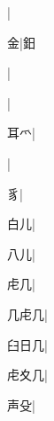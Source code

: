 \begin{multicols}{2}
{{}\mktsJzrVerticalBar{}{\cjk{}{\cnsym{}　}{\cnsym{}　}{\cnsym{}　}}|{}\par
{\cjk{}{\cnsym{}　}{\cnsym{}　}金}\mktsJzrVerticalBar{}{\cjk{}{\cnsym{}　}{\cnsym{}　}{\cnsym{}　}}|{\cjk{}鈤}\par
{}\mktsJzrVerticalBar{}{\cjk{}{\cnsym{}　}{\cnsym{}　}{\cnsym{}　}}|{}\par
{}\mktsJzrVerticalBar{}{\cjk{}{\cnsym{}　}{\cnsym{}　}{\cnsym{}　}}|{}\par
{\cjk{}{\cnsym{}　}耳{爫}}\mktsJzrVerticalBar{}{\cjk{}{\cnsym{}　}{\cnsym{}　}{\cnsym{}　}}|{}\par
{}\mktsJzrVerticalBar{}{\cjk{}{\cnsym{}　}{\cnsym{}　}{\cnsym{}　}}|{}\par
{\cjk{}{\cnsym{}　}{\cnsym{}　}豸}\mktsJzrVerticalBar{}{\cjk{}{\cnsym{}　}{\cnsym{}　}{\cnsym{}　}}|{}\par
{\cjk{}{\cnsym{}　}白儿}\mktsJzrVerticalBar{}{\cjk{}{\cnsym{}　}{\cnsym{}　}{\cnsym{}　}}|{}\par
{\cjk{}{\cnsym{}　}八儿}\mktsJzrVerticalBar{}{\cjk{}{\cnsym{}　}{\cnsym{}　}{\cnsym{}　}}|{}\par
{\cjk{}{\cnsym{}　}虍几}\mktsJzrVerticalBar{}{\cjk{}{\cnsym{}　}{\cnsym{}　}{\cnsym{}　}}|{}\par
{\cjk{}几虍几}|{}\par
{\cjk{}臼日几}|{}\par
{\cjk{}虍夊几}\mktsJzrVerticalBar{}{\cjk{}{\cnsym{}　}{\cnsym{}　}{\cnsym{}　}}|{}\par
{\cjk{}{\cnsym{}　}声殳}\mktsJzrVerticalBar{}{\cjk{}{\cnsym{}　}{\cnsym{}　}{\cnsym{}　}}|{}\par
}
\end{multicols}
